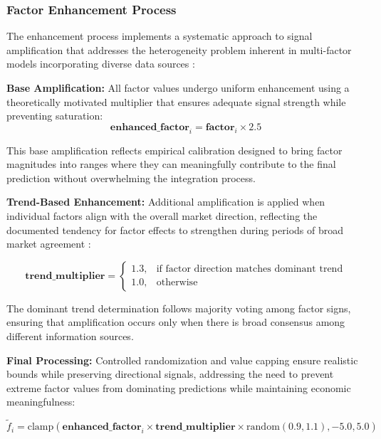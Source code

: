 \documentclass[3p,times,procedia]{elsarticle}
\begin{document}
\subsubsection{{Factor Enhancement Process}}

The enhancement process implements a systematic approach to signal amplification that addresses the heterogeneity problem inherent in multi-factor models incorporating diverse data sources \cite{Harvey2016}:

\textbf{Base Amplification:}
All factor values undergo uniform enhancement using a theoretically motivated multiplier that ensures adequate signal strength while preventing saturation:
\begin{equation}
\textbf{enhanced\_factor}_i = \textbf{factor}_i \times 2.5
\end{equation}

This base amplification reflects empirical calibration designed to bring factor magnitudes into ranges where they can meaningfully contribute to the final prediction without overwhelming the integration process.

\textbf{Trend-Based Enhancement:}
Additional amplification is applied when individual factors align with the overall market direction, reflecting the documented tendency for factor effects to strengthen during periods of broad market agreement \cite{Lo2004}:

\begin{equation}
\textbf{trend\_multiplier} = 
\begin{cases} 
1.3, & \text{if factor direction matches dominant trend} \\
1.0, & \text{otherwise}
\end{cases}
\end{equation}

The dominant trend determination follows majority voting among factor signs, ensuring that amplification occurs only when there is broad consensus among different information sources.

\textbf{Final Processing:}
Controlled randomization and value capping ensure realistic bounds while preserving directional signals, addressing the need to prevent extreme factor values from dominating predictions while maintaining economic meaningfulness:

\begin{equation}
\tilde{f}_i = \text{clamp}\left(\textbf{enhanced\_factor}_i \times \textbf{trend\_multiplier} \times \text{random}(0.9, 1.1), -5.0, 5.0\right)
\end{equation}
\end{document}
